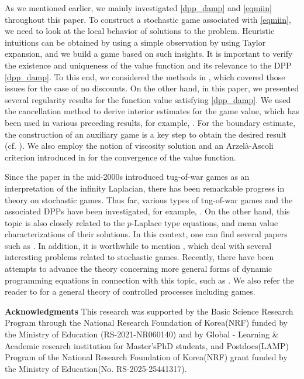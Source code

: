 \documentclass[english]{amsart}
\theoremstyle{plain}
\theoremstyle{definition}
\theoremstyle{remark}
\numberwithin{equation}{section}
\begin{document}
As we mentioned earlier, we mainly investigated \eqref{dpp_damp} and \eqref{eqmiin} throughout this paper.
To construct a stochastic game associated with \eqref{eqmiin}, we need to look at the local behavior of solutions to the problem.
Heuristic intuitions can be obtained by using a simple observation by using Taylor expansion, and we build a game based on such insights.
It is important to verify the existence and uniqueness of the value function and its relevance to the DPP \eqref{dpp_damp}.
To this end, we considered the methods in \cite{MR3161602}, which covered those issues for the case of no discounts.
On the other hand, in this paper, we presented several regularity results for the function value satisfying \eqref{dpp_damp}. We used the cancellation method to derive interior estimates for the game value, which has been used in various preceding results, for example, \cite{MR3494400,MR4125101}.
For the boundary estimate, the construction of an auxiliary game is a key step to obtain the desired result (cf. \cite{MR3011990,MR4299842}).
We also employ the notion of viscosity solution and an Arzel\`{a}-Ascoli criterion introduced in \cite{MR3011990} for the convergence of the value function.


Since the paper \cite{MR2449057} in the mid-2000s introduced tug-of-war games as an interpretation of the infinity Laplacian, there has been remarkable progress in theory on stochastic games.
Thus far, various types of tug-of-war games and the associated DPPs have been investigated, for example, \cite{MR2451291,MR2887928,MR4257616}.
On the other hand, this topic is also closely related to the $p$-Laplace type equations, and mean value characterizations of their solutions. 
In this context, one can find several papers such as \cite{MR2566554,MR2684311,MR3011990,MR3177660,MR3846232}.
In addition, it is worthwhile to mention \cite{MR3893728,MR3977220,MR4684373,MR4684385,arroyo2024krylov}, which deal with several interesting problems related to stochastic games.
Recently, there have been attempts to advance the theory concerning more general forms of dynamic programming equations in connection with this topic, such as \cite{MR4496902,MR4565418}.
We also refer the reader to \cite{MR601776,MR1199811} for a general theory of controlled processes including games.

{\bf Acknowledgments} This research was supported by the Basic Science Research Program through the National Research Foundation of Korea(NRF) funded by the Ministry of Education (RS-2021-NR060140) and by Global - Learning \& Academic research institution for Master's\textperiodcentered PhD students, and Postdocs(LAMP) Program of the National Research Foundation of Korea(NRF) grant funded by the Ministry of Education(No. RS-2025-25441317).
\end{document}
